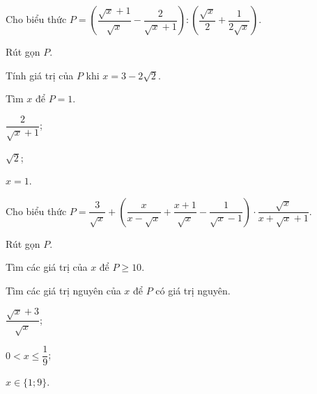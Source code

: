 \begin{bt}%
	Cho biểu thức $P=\left(\dfrac{\sqrt{x} + 1}{\sqrt{x}} - \dfrac{2}{\sqrt{x} + 1}\right) :\left(\dfrac{\sqrt{x}}{2} + \dfrac{1}{2\sqrt{x}}\right)$.
\begin{listEX}
	\item Rút gọn $P.$
	\item Tính giá trị của $P$ khi $x=3-2\sqrt{2}$.
	\item Tìm $x$ để $P=1.$
\end{listEX}
\loigiai
{
	\begin{listEX}[3]
	\item $\dfrac{2}{\sqrt{x} + 1}$;
	\item $\sqrt{2}$;
	\item $x=1$.
	\end{listEX}
}
\end{bt}
\begin{bt}%
	Cho biểu thức $P=\dfrac{3}{\sqrt{x}} + \left(\dfrac{x}{x - \sqrt{x}} + \dfrac{x + 1}{\sqrt{x}} - \dfrac{1}{\sqrt{x} - 1}\right)\cdot\dfrac{\sqrt{x}}{x + \sqrt{x} + 1}$.
\begin{listEX}
	\item Rút gọn $P$.
	\item Tìm các giá trị của $x$ để $P\ge 10$.
	\item Tìm các giá trị nguyên của 
	$x$ để $P$ có giá trị nguyên.
\end{listEX}
\loigiai
{
	\begin{listEX}[3]
	\item $\dfrac{\sqrt{x} + 3}{\sqrt{x}}$;
	\item $0<x\leq\dfrac{1}{9}$;
	\item $x\in\{1 ; 9\}$.
	\end{listEX}
}
\end{bt}


